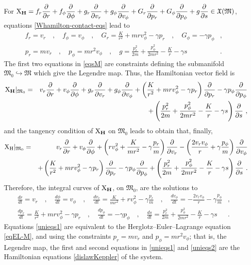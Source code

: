 \documentclass[12pt]{report}
\def\bea{\begin{eqnarray}}
\def\eea{\end{eqnarray}}
\def\beann{\begin{eqnarray*}}
\def\eeann{\end{eqnarray*}}
\def\dst{\displaystyle}
\def\derpar#1#2{\frac{\partial{#1}}{\partial{#2}}}
\def\vf{\mathfrak X}
\def\X{{\rm X}}
\begin{document}
For $\displaystyle \X_{\bf H}=f_r\derpar{}{r}+
f_\phi\derpar{}{\phi}+g_r\derpar{}{v_r}+g_\phi\derpar{}{v_\phi}+G_r\derpar{}{p_r}+G_\phi\derpar{}{p_\phi}+g\derpar{}{s}\in\vf(\mathfrak{M})$,
equations \eqref{Whamilton-contact-eqs} lead to
\bea
f_r=v_r \quad , \quad f_\phi=v_\phi \quad , \quad 
G_r=\frac{K}{r^2}+mrv_\phi^2-\gamma p_r \quad , \quad G_\phi=-\gamma p_\phi & , & 
\nonumber \\
p_r=mv_r \quad , \quad p_\phi=mr^2v_\phi \quad , \quad
g=\frac{p_r^2}{2m}+\frac{p_\phi^2}{2mr^2}-\frac{K}{r}-\gamma s & . & \label{eqsM}
\eea
The first two equations in \eqref{eqsM} are constraints defining the submanifold
$\mathfrak{M}_0\hookrightarrow\mathfrak{M}$ which give the Legendre map.
Thus, the Hamiltonian vector field is
\beann
\X_{\bf H}\vert_{\mathfrak{M}_0}&=&
v_r\derpar{}{r}+v_\phi\derpar{}{\phi}+g_r\derpar{}{v_r}+g_\phi\derpar{}{v_\phi}
+\left(\frac{K}{r^2}+mrv_\phi^2-\gamma p_ r\right)\derpar{}{p_r}-\gamma p_\phi\derpar{}{p_\phi} \\ & &
+\left(\frac{p_r^2}{2m}+\frac{p_\phi^2}{2mr^2}-\frac{K}{r}-\gamma s\right)\derpar{}{s} \ ,
\eeann
and the tangency condition of $\X_{\bf H}$ on $\mathfrak{M}_0$ leads to obtain that, finally,
\beann
\X_{\rm H}\vert_{\mathfrak{M}_0}&=&
v_r\derpar{}{r}+v_\phi\derpar{}{\phi}+
\left(rv_\phi^2+\dst\frac{K}{mr^2}-\gamma\frac{p_r}{m}\right)\derpar{}{v_r}-\left(\frac{2v_rv_\phi}{r}+\gamma\frac{p_\phi}{m}\right)\derpar{}{v_\phi}
\\ & &
+\left(\frac{K}{r^2}+mrv_\phi^2-\gamma p_ r\right)\derpar{}{p_r}-\gamma p_\phi\derpar{}{p_\phi}+\left(\frac{p_r^2}{2m}+\frac{p_\phi^2}{2mr^2}-\frac{K}{r}-\gamma s\right)\derpar{}{s} \ .
\eeann
Therefore, the integral curves of $\X_{\bf H}$,
on $\mathfrak{M}_0$, are the solutions to
\bea
\frac{dr}{dt}=v_r \quad , \quad
\frac{d\phi}{dt}=v_\phi \quad , \quad
\frac{dv_r}{dt}=\frac{K}{mr^2}+rv_\phi^2-\gamma\frac{p_r}{m} \quad , \quad
\frac{dv_\phi}{dt}=-\frac{2v_rv_\phi}{r}-\gamma\frac{p_\phi}{m} & , &
\label{unieqs1}
\\
\frac{dp_r}{dt}=\frac{K}{r^2}+mrv_\phi^2-\gamma p_r \quad , \quad
\frac{dp_\phi}{dt}=-\gamma p_\phi \quad , \quad
\frac{ds}{dt}=\frac{p_r^2}{2m}+\frac{p_\phi^2}{2mr^2}-\frac{K}{r}-\gamma s & . &
\label{unieqs2}
\eea
Equations \eqref{unieqs1} are equivalent to the Herglotz--Euler--Lagrange equation \eqref{eqEL-M},
and using the constraints $p_r=mv_r$ 
and $p_\phi=mr^2v_\phi$; that is, the Legendre map,
the first and second equations in \eqref{unieqs1} and \eqref{unieqs2} are
the Hamiltonian equations \eqref{dislawKeppler} of the system.
\end{document}
